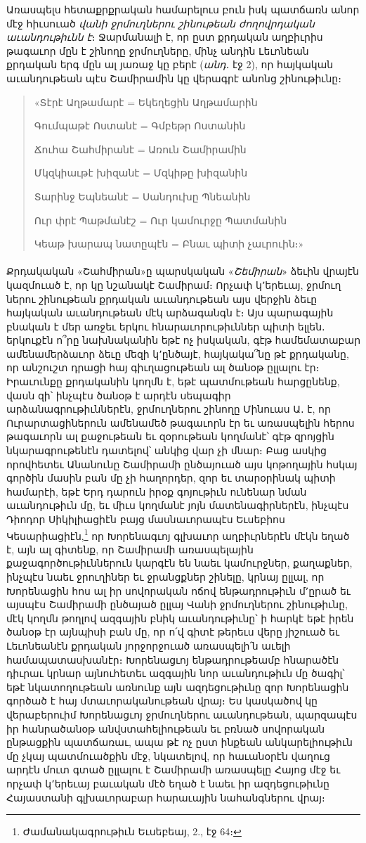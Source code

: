 \documentclass{article}
\begin{document}
{Առասպելս հետաքրքրական համարելուս բուն իսկ պատճառն անոր մէջ հիւսուած \emph{վանի ջրմուղներու շինութեան ժողովրդական աւանդութիւնն է}։ Ջարմանալի է, որ ըստ քրդական աղբիւրիս թագաւոր մըն է շինողը ջրմուղները, մինչ անդին Լեւոնեան քրդական երգ մըն ալ յառաջ կը բերէ (\emph{անդ․} էջ 2), որ հայկական աւանդութեան պէս Շամիրամին կը վերագրէ անոնց շինութիւնը։
\begin{quotation}
\arm
\large
«Տէրէ Աղթամարէ = Եկեղեցին Աղթամարին

Գումպաթէ Ոստանէ = Գմբեթր Ոստանին

Ճուհա Շահմիրանէ = Առուն Շամիրամին

Մկզկիաւթէ խիզանէ = Մզկիթը խիզանին

Տարինջ Եպնեանէ = Սանդուխը Պնեանին

Ուր փրէ Պաթմանէշ = Ուր կամուրջը Պատմանին

Կեաթ խարապ նատըպէն = Բնաւ պիտի չաւրուին։»
\end{quotation}
\paragraph{}
Քրդակական «Շահմիրան»ը պարսկական «\emph{Շեմիրան}» ձեւին վրայէն կազմուած է, որ կը նշանակէ Շամիրամ։ Որչափ կ՚երեւայ, ջրմուղ ներու շինութեան քրդական աւանդութեան այս վերջին ձեւը հայկական աւանդութեան մէկ արձագանգն է։ Այս պարագային բնական է մեր առջեւ երկու հնարաւորութիւններ պիտի ելլեն․ երկուքէն ո՞րը նախնականին եթէ ոչ իսկական, գէթ համեմատաբար ամենամերձաւոր ձեւը մեզի կ՚ընծայէ, հայկակա՞նը թէ քրդականը, որ անշուշտ դրացի հայ գիւղացութեան ալ ծանօթ ըլլալու էր։ Իրաւունքը քրդականին կողմն է, եթէ պատմութեան հարցընենք, վասն զի՝ ինչպէս ծանօթ է արդէն սեպագիր արձանագրութիւններէն, ջրմուղներու շինողը Մինուաս Ա․ է, որ Ուրարտացիներուն ամենամեծ թագաւորն էր եւ առասպելին հերոս թագաւորն ալ քաջութեան եւ զօրութեան կողմանէ՝ գէթ զրոյցին նկարագրութենէն դատելով՝ անկից վար չի մնար։ Բաց ասկից որովհետեւ Անանունը Շամիրամի ընծայուած այս կոթողային հսկայ գործին մասին բան մը չի հաղորդեր, զոր եւ տարօրինակ պիտի համարէի, եթէ Երդ դարուն իրօք գոյութիւն ունենար նման աւանդութիւն մը, եւ միւս կողմանէ յոյն մատենագիրներէն, ինչպէս Դիոդոր Սիկիլիացիէն բայց մասնաւորապէս Եւսեբիոս Կեսարիացիէն,\footnote{Ժամանակագրութիւն Եւսեբեայ, 2., էջ 64։} որ Խորենագւոյ գլխաւոր աղբիւրներէն մէկն եղած է, այն ալ գիտենք, որ Շամիրամի առասպելային քաջագործութիւններուն կարգէն են նաեւ կամուրջներ, քաղաքներ, ինչպէս նաեւ ջրուղիներ եւ ջրանցքներ շինելը, կրնայ ըլլալ, որ Խորենացին հոս ալ իր սովորական ոճով ենթադրութիւն մ՚ըրած եւ այսպէս Շամիրամի ընծայած ըլլայ Վանի ջրմուղներու շինութիւնը, մէկ կողմն թողլով ազգային բնիկ աւանդութիւնը՝ ի հարկէ եթէ իրեն ծանօթ էր այնպիսի բան մը, որ ո՛վ գիտէ թերեւս վերը յիշուած եւ Լեւոնեանէն քրդական յորջորջուած առասպելի՛ն աւելի համապատասխանէր։ Խորենացւոյ ենթադրութեամբ հնարածէն դիւրաւ կրնար այնուհետեւ ազգային նոր աւանդութիւն մը ծագիլ՝ եթէ նկատողութեան առնունք այն ազդեցութիւնը զոր Խորենացին գործած է հայ մտաւորականութեան վրայ։ Ես կասկածով կը վերաբերուիմ Խորենացւոյ ջրմուղներու աւանդութեան, պարզապէս իր հանրածանօթ անվստահելիութեան եւ բռնած սովորական ընթացքին պատճառաւ, ապա թէ ոչ ըստ ինքեան անկարելիութիւն մը չկայ պատմուածքին մէջ, նկատելով, որ հաւանօրէն վաղուց արդէն մուտ գտած ըլլալու է Շամիրամի առասպելը Հայոց մէջ եւ որչափ կ՚երեւայ բաւական մէծ եղած է նաեւ իր ազդեցութիւնը Հայաստանի գլխաւորաբար հարաւային նահանգներու վրայ։

}
\end{document}
